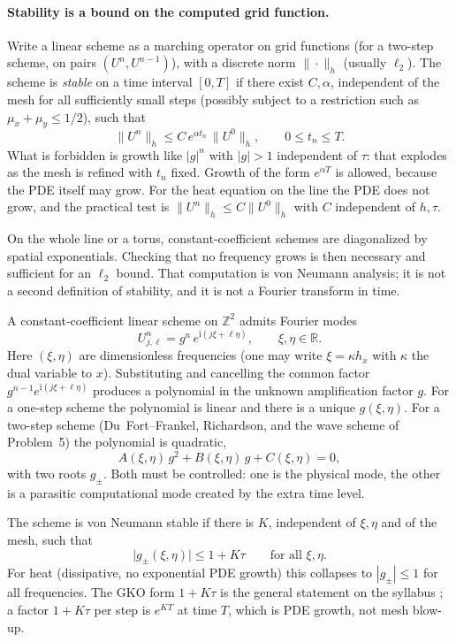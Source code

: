 \paragraph{Stability is a bound on the computed grid function.}

\begin{definition}
\label{def:lax-richtmyer}
Write a linear scheme as a marching operator on grid functions (for a two-step scheme, on pairs \((U^n,U^{n-1})\)), with a discrete norm \(\|\cdot\|_h\) (usually \(\ell_2\)). The scheme is \emph{stable} on a time interval \([0,T]\) if there exist \(C,\alpha\), independent of the mesh for all sufficiently small steps (possibly subject to a restriction such as \(\mu_x+\mu_y\le 1/2\)), such that
\[
\|U^n\|_h
\le
C\,e^{\alpha t_n}\,\|U^0\|_h,
\qquad
0\le t_n\le T.
\]
What is forbidden is growth like \(|g|^n\) with \(|g|>1\) independent of \(\tau\): that explodes as the mesh is refined with \(t_n\) fixed. Growth of the form \(e^{\alpha T}\) is allowed, because the PDE itself may grow. For the heat equation on the line the PDE does not grow, and the practical test is \(\|U^n\|_h\le C\|U^0\|_h\) with \(C\) independent of \(h,\tau\).
\end{definition}

On the whole line or a torus, constant-coefficient schemes are diagonalized by spatial exponentials. Checking that no frequency grows is then necessary and sufficient for an \(\ell_2\) bound. That computation is von Neumann analysis; it is not a second definition of stability, and it is not a Fourier transform in time.

\begin{definition}
\label{def:von-neumann}
A constant-coefficient linear scheme on \(\mathbb Z^2\) admits Fourier modes
\[
U_{j,\ell}^n
=
g^n\,e^{\mathrm i(j\xi+\ell\eta)},
\qquad
\xi,\eta\in\mathbb R.
\]
Here \((\xi,\eta)\) are dimensionless frequencies (one may write \(\xi=\kappa h_x\) with \(\kappa\) the dual variable to \(x\)). Substituting and cancelling the common factor \(g^{n-1}e^{\mathrm i(j\xi+\ell\eta)}\) produces a polynomial in the unknown amplification factor \(g\). For a one-step scheme the polynomial is linear and there is a unique \(g(\xi,\eta)\). For a two-step scheme (Du~Fort--Frankel, Richardson, and the wave scheme of Problem~5) the polynomial is quadratic,
\[
A(\xi,\eta)\,g^2+B(\xi,\eta)\,g+C(\xi,\eta)=0,
\]
with two roots \(g_\pm\). Both must be controlled: one is the physical mode, the other is a parasitic computational mode created by the extra time level.

The scheme is von Neumann stable if there is \(K\), independent of \(\xi,\eta\) and of the mesh, such that
\[
\bigl|g_\pm(\xi,\eta)\bigr|
\le
1+K\tau
\qquad
\text{for all }\xi,\eta.
\]
For heat (dissipative, no exponential PDE growth) this collapses to \(|g_\pm|\le 1\) for all frequencies. The GKO form \(1+K\tau\) is the general statement on the syllabus \cite{gko95}; a factor \(1+K\tau\) per step is \(e^{KT}\) at time \(T\), which is PDE growth, not mesh blow-up.
\end{definition}

